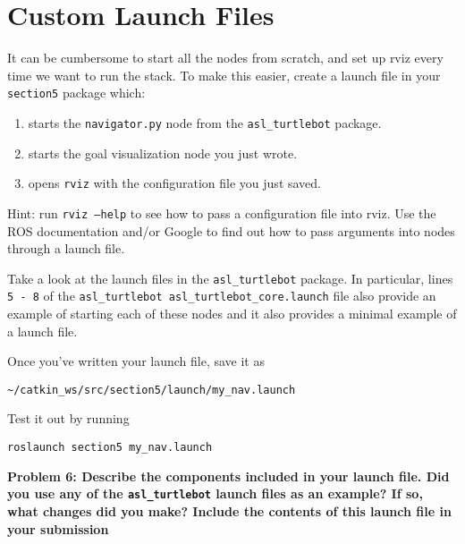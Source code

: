 \documentclass{article}
\begin{document}
\section{Custom Launch Files}
It can be cumbersome to start all the nodes from scratch, and set up rviz every time we want to run the stack. To make this easier, create a launch file in your \texttt{section5} package which:
\begin{enumerate}
    \item starts the \texttt{navigator.py} node from the \texttt{asl\_turtlebot} package.
    \item starts the goal visualization node you just wrote.
    \item opens \texttt{rviz} with the configuration file you just saved.
\end{enumerate}

Hint: run \texttt{rviz --help} to see how to pass a configuration file into rviz.
Use the ROS documentation and/or Google to find out how to pass arguments into nodes through a launch file.

Take a look at the launch files in the \texttt{asl\_turtlebot} package. In particular, lines \texttt{5 - 8} of the \texttt{asl\_turtlebot asl\_turtlebot\_core.launch} file also provide an example of starting each of these nodes and it also provides a minimal example of a launch file.

Once you've written your launch file, save it as


\begin{lstlisting}
~/catkin_ws/src/section5/launch/my_nav.launch
\end{lstlisting}


Test it out by running


\begin{lstlisting}
roslaunch section5 my_nav.launch
\end{lstlisting}


\textbf{Problem 6: Describe the components included in your launch file. Did you use any of the \texttt{asl\_turtlebot} launch files as an example? If so, what changes did you make? Include the contents of this launch file in your submission}
\end{document}
